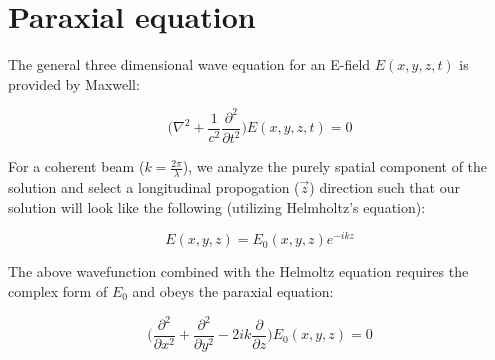 












\section{Paraxial equation} \label{sec:paraxial}

The general three dimensional wave equation for an E-field $E(x,y,z,t)$ is provided by Maxwell:

$$ \label{eq:waveq}
	\bigg( \nabla ^2 + \frac{1}{c^2} \frac{\partial^2}{\partial t^2} \bigg) E(x,y,z,t) = 0
$$

For a coherent beam ($k = \frac{2 \pi}{\lambda}$), we analyze the purely spatial component of the solution and select a longitudinal propogation ($\vec{z}$) direction such that our solution will look like the following (utilizing Helmholtz's equation):

$$
	E(x,y,z) = E_0(x,y,z) e^{-ikz}
$$

The above wavefunction combined with the Helmoltz equation requires the complex form of $E_0$ and obeys the paraxial equation:

\begin{equation}\label{eq:paraxial}
	\bigg( \frac{\partial^2}{\partial x ^2} + \frac{\partial^2}{\partial y^2} - 2ik \frac{\partial}{\partial z} \bigg) E_0(x,y,z) = 0
\end{equation}

